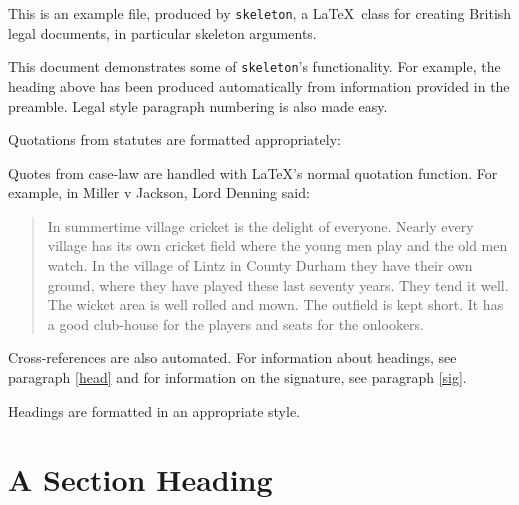\documentclass[10pt, oneside]{skeleton}
\date{\today}
\begin{document}
	
	\legalhead
			
	\pa This is an example file, produced by \texttt{skeleton}, a \LaTeX\ class for creating British legal documents, in particular skeleton arguments.
	
	\pa This document demonstrates some of \texttt{skeleton}'s functionality. For example, the heading above has been produced automatically from information provided in the preamble. Legal style paragraph numbering is also made easy.\label{head}

	\pa Quotations from statutes are formatted appropriately:
	
	\begin{statquote}
		\begin{instatquote}
			\end{instatquote}
	\end{statquote}
	
	\pa Quotes from case-law are handled with \LaTeX's normal quotation function. For example, in Miller v Jackson, Lord Denning said:
	
	\begin{quotation}
		In summertime village cricket is the delight of everyone. Nearly every village has its own cricket field where the young men play and the old men watch. In the village of Lintz in County Durham they have their own ground, where they have played these last seventy years. They tend it well. The wicket area is well rolled and mown. The outfield is kept short. It has a good club-house for the players and seats for the onlookers.
	\end{quotation} 

	\pa Cross-references are also automated. For information about headings, see paragraph \ref{head} and for information on the signature, see paragraph \ref{sig}.
	
	\pa Headings are formatted in an appropriate style.
	
	\section{A Section Heading} %
	\label{sec:a_section_heading}
	
\end{document}
